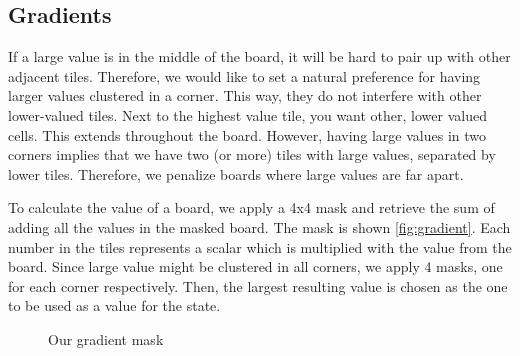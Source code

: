 \documentclass[journal]{IEEEtran}
\begin{document}
\subsection*{Gradients}
If a large value is in the middle of the board, it will be hard to pair up
with other adjacent tiles. Therefore, we would like to set a natural preference
for having larger values clustered in a corner. This way, they do not interfere
with other lower-valued tiles. Next to the highest value tile, you want other,
lower valued cells. This extends throughout the board. However, having large values
in two corners implies that we have two (or more) tiles with large values, separated
by lower tiles. Therefore, we penalize boards where large values are far apart.

To calculate the value of a board, we apply a 4x4 mask and retrieve the
sum of adding all the values in the masked board.  
The mask is shown \autoref{fig:gradient}. Each number in the tiles represents a scalar
which is multiplied with the value from the board. Since large value might be clustered
in all corners, we apply 4 masks, one for each corner respectively. Then,
the largest resulting value is chosen as the one to be used as a value for the state.

\begin{figure}[Hb]
\centering
    \caption{Our gradient mask}
\label{fig:gradient}
\end{figure}
\end{document}
